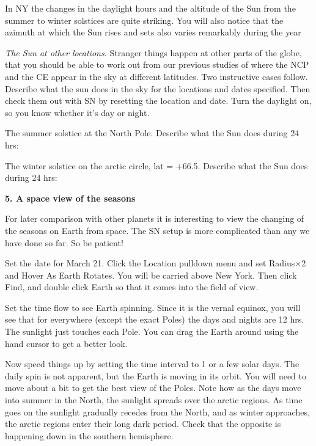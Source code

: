 In NY the changes in the daylight hours and the altitude of the Sun 
from the summer to winter solstices are quite striking. You will also
notice that the azimuth at which the Sun rises and sets also varies
remarkably during the year



\bigskip
\noindent
\emph{The Sun at other locations.} Stranger things happen at other
parts of the globe, that you should be able to work out from our
previous studies of where the NCP and the CE appear in the sky at
different latitudes.  Two instructive cases follow.  Describe what the
sun does in the sky for the locations and dates specified.  Then check
them out with SN by resetting the location and date. Turn the daylight
on, so you know whether it's day or night.

\medskip
 The summer solstice at the North Pole. Describe what the Sun
does during 24 hrs:

\medskip
 \hrulefill

\medskip
The winter solstice on the arctic circle, lat =
+66.5\deg.  Describe what the Sun does during 24 hrs:

\medskip
\hrulefill



\bigskip
\bigskip
\noindent
{\bf 5. A space view of the seasons}

\medskip
\noindent
For later comparison with other planets it is interesting to view the
changing of the seasons on Earth from space. The SN setup is more
complicated than any we have done so far. So be patient!

Set the date for March 21. Click the Location pulldown menu and set
Radius$\times$2 and Hover As Earth Rotates.  You will be carried above
New York. Then click Find, and
double click Earth so that it comes into the field of view. 

Set the time flow to see Earth spinning. Since it
is the vernal equinox, you will see that for everywhere (except the exact
Poles) the days and nights are 12 hrs. The sunlight just touches each
Pole. You can drag the Earth around using the hand cursor to get a
better look.

Now speed things up by setting the time interval to 1 or a few solar days. The
daily spin is not apparent, but the Earth is moving in its orbit. You will need to move about a bit to get the best
view of the Poles.  Note how as the days move into summer in the
North, the sunlight spreads over the arctic regions.
As time goes on the sunlight gradually recedes from the North, and as
winter approaches, the arctic regions enter their long dark
period. Check that the opposite is happening down in the southern
hemisphere.

